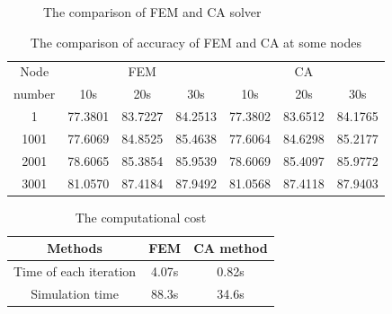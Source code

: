 \documentclass[review]{elsarticle}
\begin{document}
\begin{figure}

\caption{The comparison of FEM and CA solver}
\label{fig:FEM_CA}
\end{figure}

\begin{table}[]
    \centering
    \caption{The comparison of accuracy of FEM and CA at some nodes }
    \begin{tabular}{c c c c c c c}
    \hline
         Node & \multicolumn{3}{c}{FEM } &  \multicolumn{3}{c}{CA} \\
         \cline{2-7}
         number & 10s & 20s & 30s & 10s & 20s & 30s\\
         \hline
         1	&77.3801&83.7227&84.2513&77.3802&83.6512&84.1765\\
        1001 & 77.6069 & 84.8525 & 85.4638 & 77.6064 & 84.6298 & 85.2177\\
        2001 & 78.6065 & 85.3854 & 85.9539 & 78.6069 & 85.4097 & 85.9772\\
        3001 & 81.0570 & 87.4184 & 87.9492 & 81.0568 & 87.4118 & 87.9403\\
        \hline
    \end{tabular}
    \label{tab:com_FEM_CA}
\end{table}

\begin{table}[]
    \centering
    \caption{The computational cost}
    \begin{tabular}{c c c}
    \hline
         Methods & FEM & CA method \\
         \hline
        Time of each iteration & 4.07s & 0.82s\\
        Simulation time & 88.3s & 34.6s\\
        \hline
    \end{tabular}
    \label{tab:com_cost}
\end{table}
\end{document}
